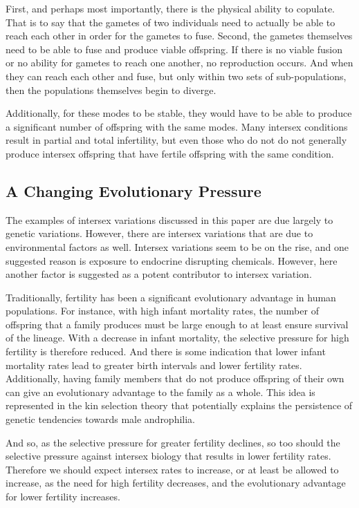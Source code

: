 \documentclass{article}
\begin{document}
First, and perhaps most importantly, there is the physical ability to copulate. That is to say that the gametes of two individuals need to actually be able to reach each other in order for the gametes to fuse. Second, the gametes themselves need to be able to fuse and produce viable oﬀspring. If there is no viable fusion or no ability for gametes to reach one another, no reproduction occurs. And when they can reach each other and fuse, but only within two sets of sub-populations, then the populations themselves begin to diverge.

Additionally, for these modes to be stable, they would have to be able to produce a significant number of offspring with the same modes. Many intersex conditions result in partial and total infertility, but even those who do not do not generally produce intersex offspring that have fertile offspring with the same condition.
\subsection{A Changing Evolutionary Pressure}
The examples of intersex variations discussed in this paper are due largely to genetic variations. However, there are intersex variations that are due to environmental factors as well. Intersex variations seem to be on the rise, and one suggested reason is exposure to endocrine disrupting chemicals.\cite{Rich2016} However, here another factor is suggested as a potent contributor to intersex variation.

Traditionally, fertility has been a significant evolutionary advantage in human populations. For instance, with high infant mortality rates, the number of offspring that a family produces must be large enough to at least ensure survival of the lineage. With a decrease in infant mortality, the selective pressure for high fertility is therefore reduced. And there is some indication that lower infant mortality rates lead to greater birth intervals and lower fertility rates\cite{vanSoest2018}. Additionally, having family members that do not produce offspring of their own can give an evolutionary advantage to the family as a whole. This idea is represented in the kin selection theory that potentially explains the persistence of genetic tendencies towards male androphilia. 

And so, as the selective pressure for greater fertility declines, so too should the selective pressure against intersex biology that results in lower fertility rates. Therefore we should expect intersex rates to increase, or at least be allowed to increase, as the need for high fertility decreases, and the evolutionary advantage for lower fertility increases.
\end{document}
